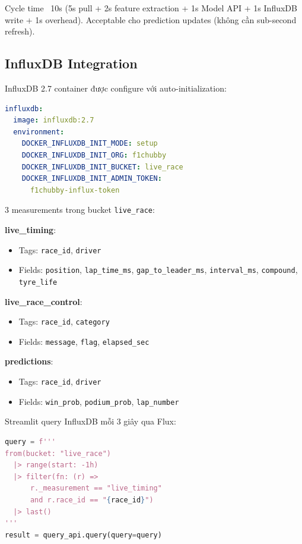 \documentclass[conference,10pt]{IEEEtran}
\begin{document}
Cycle time ~10s (5s pull + 2s feature extraction + 1s Model API + 1s InfluxDB write + 1s overhead). Acceptable cho prediction updates (không cần sub-second refresh).

\subsection{InfluxDB Integration}

InfluxDB 2.7 container được configure với auto-initialization:

\begin{lstlisting}[language=yaml]
influxdb:
  image: influxdb:2.7
  environment:
    DOCKER_INFLUXDB_INIT_MODE: setup
    DOCKER_INFLUXDB_INIT_ORG: f1chubby
    DOCKER_INFLUXDB_INIT_BUCKET: live_race
    DOCKER_INFLUXDB_INIT_ADMIN_TOKEN:
      f1chubby-influx-token
\end{lstlisting}

3 measurements trong bucket \texttt{live\_race}:

\textbf{live\_timing}:
\begin{itemize}
    \item Tags: \texttt{race\_id}, \texttt{driver}
    \item Fields: \texttt{position}, \texttt{lap\_time\_ms}, \texttt{gap\_to\_leader\_ms}, \texttt{interval\_ms}, \texttt{compound}, \texttt{tyre\_life}
\end{itemize}

\textbf{live\_race\_control}:
\begin{itemize}
    \item Tags: \texttt{race\_id}, \texttt{category}
    \item Fields: \texttt{message}, \texttt{flag}, \texttt{elapsed\_sec}
\end{itemize}

\textbf{predictions}:
\begin{itemize}
    \item Tags: \texttt{race\_id}, \texttt{driver}
    \item Fields: \texttt{win\_prob}, \texttt{podium\_prob}, \texttt{lap\_number}
\end{itemize}

Streamlit query InfluxDB mỗi 3 giây qua Flux:
\begin{lstlisting}[language=python]
query = f'''
from(bucket: "live_race")
  |> range(start: -1h)
  |> filter(fn: (r) =>
      r._measurement == "live_timing"
      and r.race_id == "{race_id}")
  |> last()
'''
result = query_api.query(query=query)
\end{lstlisting}
\end{document}
